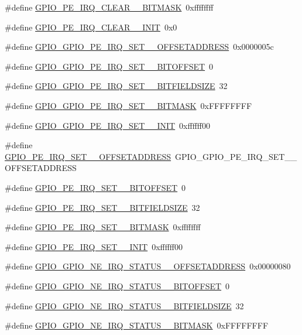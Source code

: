 \begin{DoxyCompactItemize}
\#define \hyperlink{a00553_a6bb5e60f4a3aacd7ab2181102dec6997}{GPIO\_\-PE\_\-IRQ\_\-CLEAR\_\_\-BITMASK}~0xffffffff
\item 
\#define \hyperlink{a00553_a3a8ceb6ffb06ee645f5ebb703266b4ee}{GPIO\_\-PE\_\-IRQ\_\-CLEAR\_\_\-INIT}~0x0
\item 
\#define \hyperlink{a00553_a91ed478f054519c54c45068600ec5082}{GPIO\_\-GPIO\_\-PE\_\-IRQ\_\-SET\_\_\-OFFSETADDRESS}~0x0000005c
\item 
\#define \hyperlink{a00553_a9238bfe86ea5c7d78cd5d05dfa9e3614}{GPIO\_\-GPIO\_\-PE\_\-IRQ\_\-SET\_\_\-BITOFFSET}~0
\item 
\#define \hyperlink{a00553_a13be5e7d2551f134b8b04adc84661fc1}{GPIO\_\-GPIO\_\-PE\_\-IRQ\_\-SET\_\_\-BITFIELDSIZE}~32
\item 
\#define \hyperlink{a00553_aae11b01d22ba8a6cfa303a477109a30f}{GPIO\_\-GPIO\_\-PE\_\-IRQ\_\-SET\_\_\-BITMASK}~0xFFFFFFFF
\item 
\#define \hyperlink{a00553_a2505caaad7357a48ac77dd5de8fa8ed5}{GPIO\_\-GPIO\_\-PE\_\-IRQ\_\-SET\_\_\-INIT}~0xffffff00
\item 
\#define \hyperlink{a00553_ab812fccd256b5ef67616add304a233c9}{GPIO\_\-PE\_\-IRQ\_\-SET\_\_\-OFFSETADDRESS}~GPIO\_\-GPIO\_\-PE\_\-IRQ\_\-SET\_\_\-OFFSETADDRESS
\item 
\#define \hyperlink{a00553_a6905312d07f06265d0c2a7958aca48f5}{GPIO\_\-PE\_\-IRQ\_\-SET\_\_\-BITOFFSET}~0
\item 
\#define \hyperlink{a00553_a14d473ede0cf6f64ee16e8b599e7d762}{GPIO\_\-PE\_\-IRQ\_\-SET\_\_\-BITFIELDSIZE}~32
\item 
\#define \hyperlink{a00553_ab05f7bea51e2c9a4e3e08a950cb9ff3c}{GPIO\_\-PE\_\-IRQ\_\-SET\_\_\-BITMASK}~0xffffffff
\item 
\#define \hyperlink{a00553_af4951598d2b781848c6086644d6b1b69}{GPIO\_\-PE\_\-IRQ\_\-SET\_\_\-INIT}~0xffffff00
\item 
\#define \hyperlink{a00553_ac45121f138e7cd9fafee8b0402171425}{GPIO\_\-GPIO\_\-NE\_\-IRQ\_\-STATUS\_\_\-OFFSETADDRESS}~0x00000080
\item 
\#define \hyperlink{a00553_a82551acb299732db25ac33a9864caf9e}{GPIO\_\-GPIO\_\-NE\_\-IRQ\_\-STATUS\_\_\-BITOFFSET}~0
\item 
\#define \hyperlink{a00553_ac9825c8d80cc1fab834b1b7f350ab69f}{GPIO\_\-GPIO\_\-NE\_\-IRQ\_\-STATUS\_\_\-BITFIELDSIZE}~32
\item 
\#define \hyperlink{a00553_a629078ba361b4412016397b86ed6146a}{GPIO\_\-GPIO\_\-NE\_\-IRQ\_\-STATUS\_\_\-BITMASK}~0xFFFFFFFF

\end{DoxyCompactItemize}
